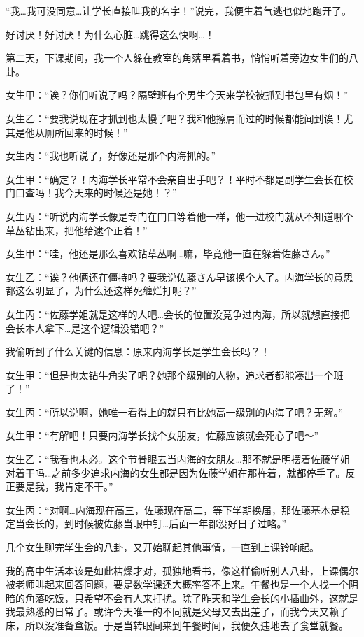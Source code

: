 “我…我可没同意…让学长直接叫我的名字！”说完，我便生着气逃也似地跑开了。

好讨厌！好讨厌！为什么心脏…跳得这么快啊…！



\newpage

\newday{\food\sunny}

第二天，下课期间，我一个人躲在教室的角落里看着书，悄悄听着旁边女生们的八卦。



女生甲：“诶？你们听说了吗？隔壁班有个男生今天来学校被抓到书包里有烟！”

女生乙：“要我说现在才抓到也太慢了吧？我和他擦肩而过的时候都能闻到诶！尤其是他从厕所回来的时候！”

女生丙：“我也听说了，好像还是那个内海抓的。”

女生甲：“确定？！内海学长平常不会亲自出手吧？！平时不都是副学生会长在校门口查吗！我今天来的时候还是她！？”

女生丙：“听说内海学长像是专门在门口等着他一样，他一进校门就从不知道哪个草丛钻出来，把他给逮个正着！”

女生甲：“哇，他还是那么喜欢钻草丛啊…嘛，毕竟他一直在躲着佐藤さん。”

女生乙：“诶？他俩还在僵持吗？要我说佐藤さん早该换个人了。内海学长的意思都这么明显了，为什么还这样死缠烂打呢？”

女生丙：“佐藤学姐就是这样的人吧…会长的位置没竞争过内海，所以就想直接把会长本人拿下…是这个逻辑没错吧？”

我偷听到了什么关键的信息：原来内海学长是学生会长吗？！

女生甲：“但是也太钻牛角尖了吧？她那个级别的人物，追求者都能凑出一个班了！”

女生丙：“所以说啊，她唯一看得上的就只有比她高一级别的内海了吧？无解。”

女生甲：“有解吧！只要内海学长找个女朋友，佐藤应该就会死心了吧～”

女生乙：“我看也未必。这个节骨眼去当内海的女朋友…那不就是明摆着佐藤学姐对着干吗…之前多少追求内海的女生都是因为佐藤学姐在那杵着，就都停手了。反正要是我，我肯定不干。”

女生丙：“对啊…内海现在高三，佐藤现在高二，等下学期换届，那佐藤基本是稳定当会长的，到时候被佐藤当眼中钉…后面一年都没好日子过咯。”

几个女生聊完学生会的八卦，又开始聊起其他事情，一直到上课铃响起。

我的高中生活本该是如此枯燥才对，孤独地看书，像这样偷听别人八卦，上课偶尔被老师叫起来回答问题，要是数学课还大概率答不上来。午餐也是一个人找一个阴暗的角落吃饭，只希望不会有人来打扰。除了昨天和学生会长的小插曲外，这就是我最熟悉的日常了。或许今天唯一的不同就是父母又去出差了，而我今天又赖了床，所以没准备盒饭。于是当转眼间来到午餐时间，我便久违地去了食堂就餐。

